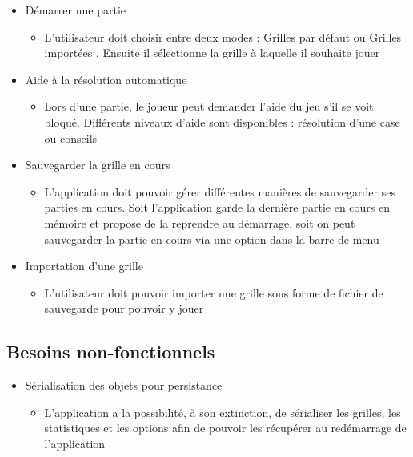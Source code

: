 \documentclass[a4paper, 12pt, twoside]{article}
\begin{document}
\begin{itemize}\setlength{\itemsep}{5mm}

 \item[\textbullet] Démarrer une partie\newline
 \begin{itemize}
  \item L'utilisateur doit choisir entre deux modes : \og Grilles par défaut \fg ou \og Grilles importées \fg. Ensuite il sélectionne la grille à laquelle il souhaite jouer
 \end{itemize}

 \item[\textbullet] Aide à la résolution automatique\newline
 \begin{itemize}
  \item Lors d'une partie, le joueur peut demander l'aide du jeu s'il se voit bloqué. Différents niveaux d'aide sont disponibles : résolution d'une case ou conseils
 \end{itemize}
 
 \item[\textbullet] Sauvegarder la grille en cours\newline
 \begin{itemize}
  \item L'application doit pouvoir gérer différentes manières de sauvegarder ses parties en cours. Soit l'application garde la dernière partie en cours en mémoire et propose de la reprendre au démarrage, soit on peut sauvegarder la partie en cours via une option dans la barre de menu
 \end{itemize}
 
 \item[\textbullet] Importation d'une grille\newline
 \begin{itemize}
  \item L'utilisateur doit pouvoir importer une grille sous forme de fichier de sauvegarde pour pouvoir y jouer
 \end{itemize}
 
\end{itemize}

\subsection{Besoins non-fonctionnels}

\begin{itemize}\setlength{\itemsep}{3mm}

 \item[\textbullet] Sérialisation des objets pour persistance\newline
 \begin{itemize}
  \item L'application a la possibilité, à son extinction,  de sérialiser les grilles, les statistiques et les options afin de pouvoir les récupérer au redémarrage de l'application
 \end{itemize}
 
\end{itemize}
\end{document}

